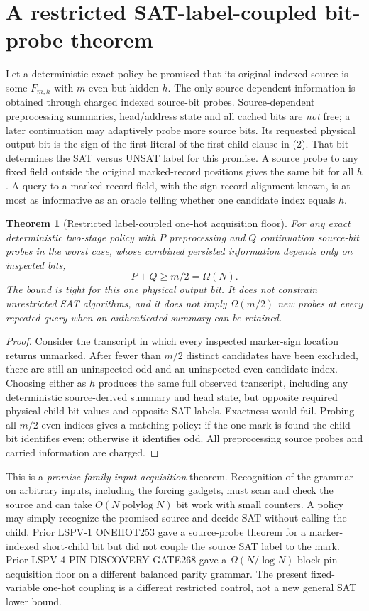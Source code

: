 \documentclass[11pt]{article}
\newtheorem{theorem}{Theorem}
\begin{document}
\section{A restricted SAT-label-coupled bit-probe theorem}
Let a deterministic exact policy be promised that its original indexed source is some $F_{m,h}$ with $m$ even but hidden $h$. The only source-dependent information is obtained through charged indexed source-bit probes. Source-dependent preprocessing summaries, head/address state and all cached bits are \emph{not} free; a later continuation may adaptively probe more source bits. Its requested physical output bit is the sign of the first literal of the first child clause in (2). That bit determines the SAT versus UNSAT label for this promise. A source probe to any fixed field outside the original marked-record positions gives the same bit for all $h$. A query to a marked-record field, with the sign-record alignment known, is at most as informative as an oracle telling whether one candidate index equals $h$.

\begin{theorem}[Restricted label-coupled one-hot acquisition floor]
For any exact deterministic two-stage policy with $P$ preprocessing and $Q$ continuation source-bit probes in the worst case, whose combined persisted information depends only on inspected bits,
\[
  P+Q\ge m/2=\Omega(N).
\tag{3}
\]
The bound is tight for this one physical output bit. It does not constrain unrestricted SAT algorithms, and it does not imply $\Omega(m/2)$ \emph{new} probes at every repeated query when an authenticated summary can be retained.
\end{theorem}
\begin{proof}
Consider the transcript in which every inspected marker-sign location returns unmarked. After fewer than $m/2$ distinct candidates have been excluded, there are still an uninspected odd and an uninspected even candidate index. Choosing either as $h$ produces the same full observed transcript, including any deterministic source-derived summary and head state, but opposite required physical child-bit values and opposite SAT labels. Exactness would fail. Probing all $m/2$ even indices gives a matching policy: if the one mark is found the child bit identifies even; otherwise it identifies odd. All preprocessing source probes and carried information are charged.
\end{proof}

This is a \emph{promise-family input-acquisition} theorem. Recognition of the grammar on arbitrary inputs, including the forcing gadgets, must scan and check the source and can take $O(N\operatorname{polylog}N)$ bit work with small counters. A policy may simply recognize the promised source and decide SAT without calling the child. Prior LSPV-1 ONEHOT253 gave a source-probe theorem for a marker-indexed short-child bit but did not couple the source SAT label to the mark. Prior LSPV-4 PIN-DISCOVERY-GATE268 gave a $\Omega(N/\log N)$ block-pin acquisition floor on a different balanced parity grammar. The present fixed-variable one-hot coupling is a different restricted control, not a new general SAT lower bound.
\end{document}
